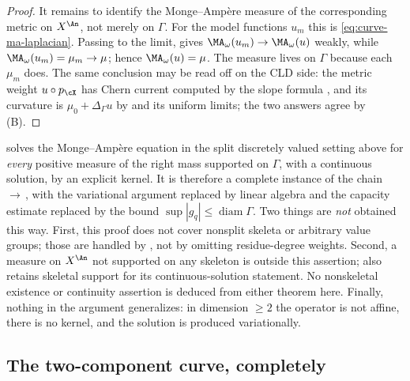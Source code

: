 \begin{proof}
It remains to identify the Monge--Amp\`ere measure of the corresponding
metric on $X^{\An}$, not merely on $\Gamma$.  For the model functions
$u_m$ this is \eqref{eq:curve-ma-laplacian}.  Passing to the limit,
 gives
$\MA_\omega(u_m)\to\MA_\omega(u)$ weakly, while
$\MA_\omega(u_m)=\mu_m\to\mu$; hence $\MA_\omega(u)=\mu$.  The measure
lives on $\Gamma$ because each $\mu_m$ does.  The same conclusion may be
read off on the CLD side: the metric weight
$u\circ p_{\cX}$ has Chern current computed by the slope formula
, and its curvature is
$\mu_0+\Delta_\Gamma u$ by  and its
uniform limits; the two answers agree by
\,(B).
\end{proof}

\begin{remark}
\label{rem:ch31-curve-solution-scope}
 solves the Monge--Amp\`ere equation in the
split discretely valued setting above for \emph{every} positive measure of
the right mass supported on $\Gamma$, with a continuous solution, by an
explicit kernel.  It is
therefore a complete instance of the chain
\,$\to$\,,
with the variational argument replaced by linear algebra and the capacity
estimate replaced by the bound $\sup|g_q|\leq\operatorname{diam}\Gamma$.
Two things are \emph{not} obtained this way.  First, this proof does not
cover nonsplit skeleta or arbitrary value groups; those are handled by
, not by omitting
residue-degree weights.  Second, a measure on
$X^{\An}$ not supported on any skeleton is outside this assertion;
 also retains skeletal support
for its continuous-solution statement.  No nonskeletal existence or
continuity assertion is deduced from either theorem here.
Finally, nothing in the argument generalizes: in dimension
$\geq2$ the operator is not affine, there is no kernel, and the solution
is produced variationally.
\end{remark}

\subsection{The two-component curve, completely}
\label{sec:ch31-two-component}


